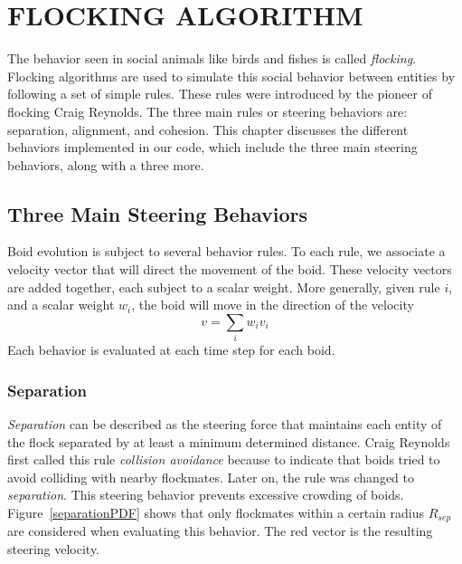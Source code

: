 \chapter{FLOCKING ALGORITHM}\label{chap3}

The behavior seen in social animals like birds and fishes is called \textit{flocking}. Flocking algorithms are used to simulate this social behavior between entities by following a set of simple rules. These rules were introduced by the pioneer of flocking Craig Reynolds\cite{craig1}. The three main rules or steering behaviors are: separation, alignment, and cohesion. This chapter discusses the different behaviors implemented in our code, which include the three main steering behaviors, along with a three more.

\section{Three Main Steering Behaviors}
Boid evolution is subject to several behavior rules. To each rule, we associate a velocity vector that will direct the movement of the boid. These velocity vectors are added together, each subject to a scalar weight. More generally, given rule $i$, and a scalar weight $w_i$, the boid will move in the direction of the velocity 
$$
v = \sum_i w_i v_i
$$
Each behavior is evaluated at each time step for each boid.

\subsection{Separation}\label{separationsection}
\textit{Separation} can be described as the steering force that maintains each entity of the flock separated by at least a minimum determined distance. Craig Reynolds first called this rule \textit{collision avoidance} because to indicate that boids tried to avoid colliding with nearby flockmates. Later on, the rule was changed to \textit{separation}. This steering behavior prevents excessive crowding of boids. Figure~\ref{separationPDF} shows that only flockmates within a certain radius $R_{sep}$ are considered when evaluating this behavior. The red vector is the resulting steering velocity.

